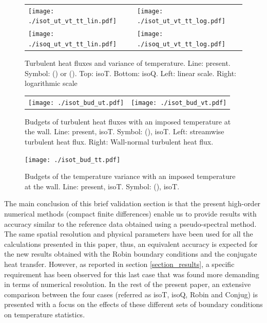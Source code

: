 \documentclass[review]{elsarticle}
\begin{document}
\begin{figure}[h!]
\begin{tabular}[htbp]{ll}
\texttt{[image: ./isot\_ut\_vt\_tt\_lin.pdf]} & 
\texttt{[image: ./isot\_ut\_vt\_tt\_log.pdf]} \\
\texttt{[image: ./isoq\_ut\_vt\_tt\_lin.pdf]} & 
\texttt{[image: ./isoq\_ut\_vt\_tt\_log.pdf]}
\end{tabular}
\caption{Turbulent heat fluxes and variance of temperature. Line: present. Symbol: (\cite{kasagi1992direct}) or (\cite{Tiselj2001dns}). Top: isoT. Bottom: isoQ. Left: linear scale. Right: logarithmic scale}
\label{isotq_ut_vt_tt}
\end{figure}

\begin{figure}[htbp]
\begin{tabular}[htbp]{ll}
\texttt{[image: ./isot\_bud\_ut.pdf]} & 
\texttt{[image: ./isot\_bud\_vt.pdf]}
\end{tabular}
\caption{Budgets of turbulent heat fluxes with an imposed temperature at the wall. Line: present, isoT. Symbol: (\cite{kasagi1992direct}), isoT. Left: streamwise turbulent heat flux. Right: Wall-normal turbulent heat flux.}
\label{isot_bud_ut_vt}
\end{figure}

\begin{figure}[htbp]
\centering
\texttt{[image: ./isot\_bud\_tt.pdf]}
\caption{Budgets of the temperature variance with an imposed temperature at the wall. Line: present, isoT. Symbol: (\cite{kasagi1992direct}), isoT.}
\label{isot_bud_tt}
\end{figure}

The main conclusion of this brief validation section is that the present high-order numerical methods (compact finite differences) enable us to provide results with accuracy similar to the reference data obtained using a pseudo-spectral method. The same spatial resolution and physical parameters have been used for all the calculations presented in this paper, thus, an equivalent accuracy is expected for the new results obtained with the Robin boundary conditions and the conjugate heat transfer. However, as reported in section \ref{section_results}, a specific requirement has been observed for this last case that was found more demanding in terms of numerical resolution. In the rest of the present paper, an extensive comparison between the four cases (referred as isoT, isoQ, Robin and Conjug) is presented with a focus on the effects of these different sets of boundary conditions on temperature statistics.
\end{document}
